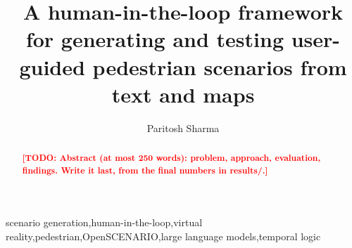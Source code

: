 \documentclass[preprint,12pt]{elsarticle}
\newif\ifanon
\newcommand{\reftext}[1]{{\color{gray}#1}}   %
\newcommand{\todo}[1]{\textcolor{red}{\textbf{[TODO: #1]}}}
\begin{document}
\begin{frontmatter}

\title{A human-in-the-loop framework for generating and testing user-guided pedestrian scenarios from text and maps}

\ifanon
\else
  \author{Paritosh Sharma}
\fi

\begin{abstract}
\todo{Abstract (at most 250 words): problem, approach, evaluation, findings. Write it last, from the final numbers in results/.}
\end{abstract}


\begin{keyword}
scenario generation\sep human-in-the-loop\sep virtual reality\sep pedestrian\sep OpenSCENARIO\sep large language models\sep temporal logic
\end{keyword}

\end{frontmatter}

\end{document}
